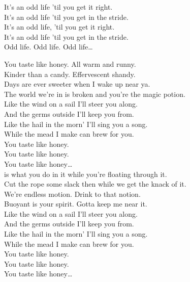 It's an odd life 'til you get it right. \\
It's an odd life 'til you get in the stride. \\
It's an odd life, 'til you get it right. \\
It's an odd life 'til you get in the stride. \\

Odd life. Odd life. Odd life… \\




You taste like honey. All warm and runny. \\
Kinder than a candy. Effervescent shandy. \\
Days are ever sweeter when I wake up near ya. \\
The world we're in is broken and you're the magic potion. \\

Like the wind on a sail I'll steer you along. \\
And the germs outside I'll keep you from. \\
Like the hail in the morn' I'll sing you a song. \\
While the mead I make can brew for you. \\

You taste like honey. \\
You taste like honey. \\
You taste like honey… \\

 is what you do in it while you're floating through it. \\
Cut the rope some slack then while we get the knack of it. \\
We're endless motion. Drink to that notion. \\
Buoyant is your spirit. Gotta keep me near it. \\

Like the wind on a sail I'll steer you along. \\
And the germs outside I'll keep you from. \\
Like the hail in the morn' I'll sing you a song. \\
While the mead I make can brew for you. \\

You taste like honey. \\
You taste like honey. \\
You taste like honey… \\


